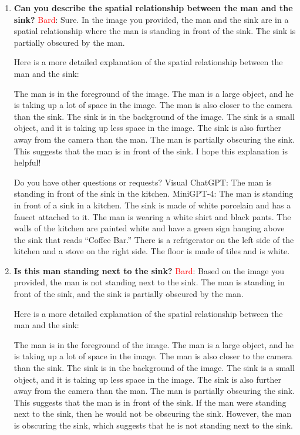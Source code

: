 \begin{enumerate}
    \item \textbf{Can you describe the spatial relationship between the man and the sink?}
    \subitem \textcolor{Red}{Bard}: 
    Sure. In the image you provided, the man and the sink are in a spatial relationship where the man is standing in front of the sink. The sink is partially obscured by the man.
    
    Here is a more detailed explanation of the spatial relationship between the man and the sink:
    
    The man is in the foreground of the image. The man is a large object, and he is taking up a lot of space in the image. The man is also closer to the camera than the sink.
    The sink is in the background of the image. The sink is a small object, and it is taking up less space in the image. The sink is also further away from the camera than the man.
    The man is partially obscuring the sink. This suggests that the man is in front of the sink.
    I hope this explanation is helpful!
    
    Do you have other questions or requests?
    \subitem Visual ChatGPT: The man is standing in front of the sink in the kitchen.
    \subitem MiniGPT-4: The man is standing in front of a sink in a kitchen. The sink is made of white porcelain and has a faucet attached to it. The man is wearing a white shirt and black pants. The walls of the kitchen are painted white and have a green sign hanging above the sink that reads “Coffee Bar.” There is a refrigerator on the left side of the kitchen and a stove on the right side. The floor is made of tiles and is white.
    \item \textbf{Is this man standing next to the sink?}
    \subitem \textcolor{Red}{Bard}: 
    Based on the image you provided, the man is not standing next to the sink. The man is standing in front of the sink, and the sink is partially obscured by the man.
    
    Here is a more detailed explanation of the spatial relationship between the man and the sink:
    
    The man is in the foreground of the image. The man is a large object, and he is taking up a lot of space in the image. The man is also closer to the camera than the sink.
    The sink is in the background of the image. The sink is a small object, and it is taking up less space in the image. The sink is also further away from the camera than the man.
    The man is partially obscuring the sink. This suggests that the man is in front of the sink.
    If the man were standing next to the sink, then he would not be obscuring the sink. However, the man is obscuring the sink, which suggests that he is not standing next to the sink.
    

\end{enumerate}
